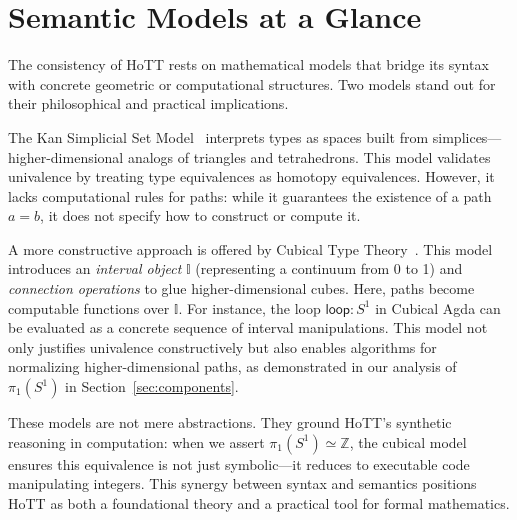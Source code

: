 \section{Semantic Models at a Glance}\label{sec:models}

The consistency of HoTT rests on mathematical models that bridge its syntax with concrete geometric or computational structures. 
Two models stand out for their philosophical and practical implications.  

The Kan Simplicial Set Model~\cite{kan1955abstract} interprets types as spaces built from simplices—higher-dimensional analogs of triangles and tetrahedrons. This model validates univalence by treating type equivalences as homotopy equivalences. However, it lacks computational rules for paths: while it guarantees the existence of a path \(a = b\), it does not specify how to construct or compute it.  

A more constructive approach is offered by Cubical Type Theory~\cite{cohen2016cubicaltypetheoryconstructive}. 
This model introduces an \emph{interval object} \(\mathbb{I}\) (representing a continuum from 0 to 1) and \emph{connection operations} to glue higher-dimensional cubes. 
Here, paths become computable functions over \(\mathbb{I}\). For instance, the loop \(\textsf{loop} : S^1\) in Cubical Agda can be evaluated as a concrete sequence of interval manipulations. This model not only justifies univalence constructively but also enables algorithms for normalizing higher-dimensional paths, as demonstrated in our analysis of \(\pi_1(S^1)\) in Section~\ref{sec:components}.  

These models are not mere abstractions. They ground HoTT's synthetic reasoning in computation: when we assert \(\pi_1(S^1) \simeq \mathbb{Z}\), the cubical model ensures this equivalence is not just symbolic—it reduces to executable code manipulating integers. This synergy between syntax and semantics positions HoTT as both a foundational theory and a practical tool for formal mathematics.  